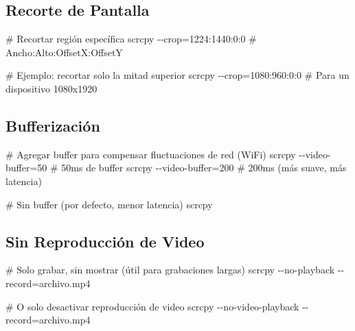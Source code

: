 \documentclass[
  doc,
  floatsintext,
  longtable,
  a4paper,
  nolmodern,
  notxfonts,
  notimes,
  12pt,
  colorlinks=true,linkcolor=blue,citecolor=blue,urlcolor=blue]{apa7}
\newenvironment{Shaded}{\begin{snugshade}}{\end{snugshade}}
\newcommand{\AttributeTok}[1]{\textcolor[rgb]{0.40,0.45,0.13}{#1}}
\newcommand{\CommentTok}[1]{\textcolor[rgb]{0.37,0.37,0.37}{#1}}
\newcommand{\ExtensionTok}[1]{\textcolor[rgb]{0.00,0.23,0.31}{#1}}
\newcommand{\NormalTok}[1]{\textcolor[rgb]{0.00,0.23,0.31}{#1}}
\newcommand{\OperatorTok}[1]{\textcolor[rgb]{0.37,0.37,0.37}{#1}}
\begin{document}
\subsection{Recorte de Pantalla}\label{recorte-de-pantalla}

\begin{Shaded}
\begin{Highlighting}[]
\CommentTok{\# Recortar región específica}
\ExtensionTok{scrcpy} \AttributeTok{{-}{-}crop}\OperatorTok{=}\NormalTok{1224:1440:0:0   }\CommentTok{\# Ancho:Alto:OffsetX:OffsetY}

\CommentTok{\# Ejemplo: recortar solo la mitad superior}
\ExtensionTok{scrcpy} \AttributeTok{{-}{-}crop}\OperatorTok{=}\NormalTok{1080:960:0:0    }\CommentTok{\# Para un dispositivo 1080x1920}
\end{Highlighting}
\end{Shaded}

\subsection{Bufferización}\label{bufferizaciuxf3n}

\begin{Shaded}
\begin{Highlighting}[]
\CommentTok{\# Agregar buffer para compensar fluctuaciones de red (WiFi)}
\ExtensionTok{scrcpy} \AttributeTok{{-}{-}video{-}buffer}\OperatorTok{=}\NormalTok{50    }\CommentTok{\# 50ms de buffer}
\ExtensionTok{scrcpy} \AttributeTok{{-}{-}video{-}buffer}\OperatorTok{=}\NormalTok{200   }\CommentTok{\# 200ms (más suave, más latencia)}

\CommentTok{\# Sin buffer (por defecto, menor latencia)}
\ExtensionTok{scrcpy}
\end{Highlighting}
\end{Shaded}

\subsection{Sin Reproducción de
Video}\label{sin-reproducciuxf3n-de-video}

\begin{Shaded}
\begin{Highlighting}[]
\CommentTok{\# Solo grabar, sin mostrar (útil para grabaciones largas)}
\ExtensionTok{scrcpy} \AttributeTok{{-}{-}no{-}playback} \AttributeTok{{-}{-}record}\OperatorTok{=}\NormalTok{archivo.mp4}

\CommentTok{\# O solo desactivar reproducción de video}
\ExtensionTok{scrcpy} \AttributeTok{{-}{-}no{-}video{-}playback} \AttributeTok{{-}{-}record}\OperatorTok{=}\NormalTok{archivo.mp4}
\end{Highlighting}
\end{Shaded}
\end{document}
